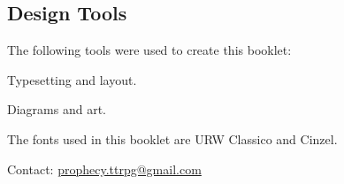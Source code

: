 \documentclass[12pt, a5paper, parskip=half-]{scrartcl}
\begin{document}
\subsection*{Design Tools} \label{subsection:design-tools}
The following tools were used to create this booklet:
\begin{description}[labelindent=0.25cm, leftmargin=\widthof{\hspace{0.25cm}\textbullet\space}, font=\normalfont\textbullet\space, noitemsep, topsep=-1ex]
	\item[XeLaTeX:] Typesetting and layout.
	\item[TikZ:] Diagrams and art.
\end{description}
\vspace{1ex}
The fonts used in this booklet are URW Classico and Cinzel.
\vspace{0.25\baselineskip}

\vfill

Contact: \href{mailto:prophecy.ttrpg@gmail.com}{prophecy.ttrpg@gmail.com}\\
\vspace{-2.5ex}\doclicenseText \hfill  \Huge{\doclicenseIcon}
\end{document}
